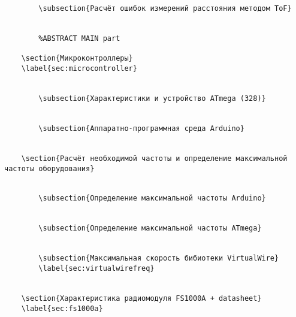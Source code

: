 \begin{verbatim}
        \subsection{Расчёт ошибок измерений расстояния методом ToF}
        

        %ABSTRACT MAIN part

    \section{Микроконтроллеры}
    \label{sec:microcontroller}
    

        \subsection{Характеристики и устройство ATmega (328)}
        

        \subsection{Аппаратно-программная среда Arduino}
        

    \section{Расчёт необходимой частоты и определение максимальной частоты оборудования}
    

        \subsection{Определение максимальной частоты Arduino}
        

        \subsection{Определение максимальной частоты ATmega}
        

        \subsection{Максимальная скорость бибиотеки VirtualWire}
        \label{sec:virtualwirefreq}
        

    \section{Характеристика радиомодуля FS1000A + datasheet}
    \label{sec:fs1000a}
    


\end{verbatim}
